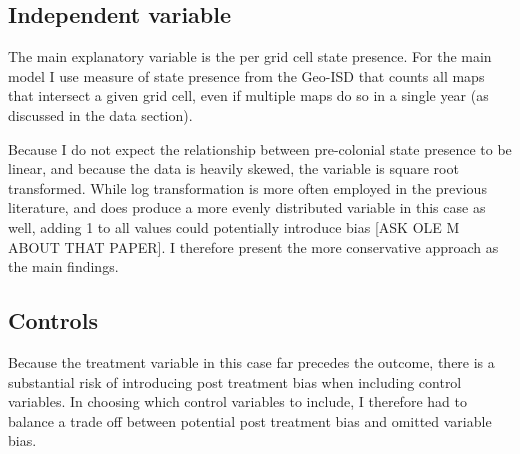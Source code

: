 \documentclass[12pt]{article}
\begin{document}

\subsection{Independent variable}

The main explanatory variable is the per grid cell state presence. For the main
model I use measure of state presence from the Geo-ISD that counts all maps that
intersect a given grid cell, even if multiple maps do so in a single year (as
discussed in the data section).


Because I do not expect the relationship between pre-colonial state presence to
be linear, and because the data is heavily skewed, the variable is square root
transformed. While log transformation is more often employed in the previous
literature, and does produce a more evenly distributed variable in this case as
well, adding 1 to all values could potentially introduce bias [ASK OLE M ABOUT
THAT PAPER]. I therefore present the more conservative approach as the main
findings.

\subsection{Controls}

Because the treatment variable in this case far precedes the outcome, there is a
substantial risk of introducing post treatment bias when including control
variables. In choosing which control variables to include, I therefore had to
balance a trade off between potential post treatment bias and omitted variable
bias. 
\end{document}
